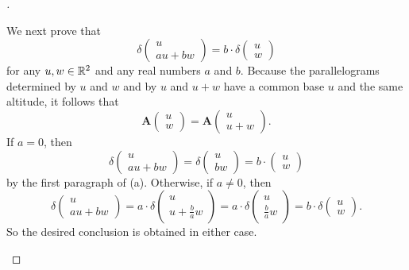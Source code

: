 \begin{proof}[]
\begin{enumerate}
          We next prove that
          \[
            \delta\begin{pmatrix}
              u \\
              au + bw
            \end{pmatrix} = b \cdot \delta\begin{pmatrix}
              u \\
              w
            \end{pmatrix}
          \]
          for any \(u, w \in \mathbb{R}^2\) and any real numbers \(a\) and \(b\).
          Because the parallelograms determined by \(u\) and \(w\) and by \(u\) and \(u + w\) have a common base \(u\) and the same altitude, it follows that
          \[
            \mathbf{A}\begin{pmatrix}
              u \\
              w
            \end{pmatrix} = \mathbf{A}\begin{pmatrix}
              u \\
              u + w
            \end{pmatrix}.
          \]
          If \(a = 0\), then
          \[
            \delta\begin{pmatrix}
              u \\
              au + bw
            \end{pmatrix} = \delta\begin{pmatrix}
              u \\
              bw
            \end{pmatrix} = b \cdot \begin{pmatrix}
              u \\
              w
            \end{pmatrix}
          \]
          by the first paragraph of (a).
          Otherwise, if \(a \neq 0\), then
          \[
            \delta\begin{pmatrix}
              u \\
              au + bw
            \end{pmatrix} = a \cdot \delta\begin{pmatrix}
              u \\
              u + \frac{b}{a} w
            \end{pmatrix} = a \cdot \delta\begin{pmatrix}
              u \\
              \frac{b}{a} w
            \end{pmatrix} = b \cdot \delta\begin{pmatrix}
              u \\
              w
            \end{pmatrix}.
          \]
          So the desired conclusion is obtained in either case.


\end{enumerate}
\end{proof}
